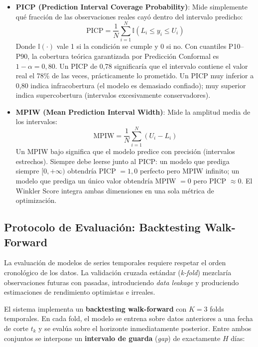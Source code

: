 \begin{itemize}
    \item \textbf{PICP (Prediction Interval Coverage Probability)}: Mide simplemente
    qué fracción de las observaciones reales cayó dentro del intervalo predicho:
    \begin{equation}
        \text{PICP} = \frac{1}{N} \sum_{i=1}^N \mathbb{I} \left( L_i \le y_i \le U_i \right)
    \end{equation}
    Donde $\mathbb{I}(\cdot)$ vale 1 si la condición se cumple y 0 si no.
    Con cuantiles P10--P90, la cobertura teórica garantizada por Predicción Conformal es
    $1 - \alpha = 0{,}80$. Un PICP de 0,78 significaría que el intervalo contiene el valor
    real el 78\% de las veces, prácticamente lo prometido. Un PICP muy inferior a 0,80
    indica infracobertura (el modelo es demasiado confiado); muy superior indica
    supercobertura (intervalos excesivamente conservadores).

    \item \textbf{MPIW (Mean Prediction Interval Width)}: Mide la amplitud media de los
    intervalos:
    \begin{equation}
        \text{MPIW} = \frac{1}{N} \sum_{i=1}^N (U_i - L_i)
    \end{equation}
    Un MPIW bajo significa que el modelo predice con precisión (intervalos estrechos).
    Siempre debe leerse junto al PICP: un modelo que prediga siempre $[0, +\infty)$
    obtendría PICP $= 1{,}0$ perfecto pero MPIW infinito; un modelo que prediga
    un único valor obtendría MPIW $= 0$ pero PICP $\approx 0$. El Winkler Score
    integra ambas dimensiones en una sola métrica de optimización.
\end{itemize}

\subsection{Protocolo de Evaluación: Backtesting Walk-Forward}
\label{sec:backtesting}

La evaluación de modelos de series temporales requiere respetar el orden cronológico de los datos. La validación cruzada estándar (\textit{k-fold}) mezclaría observaciones futuras con pasadas, introduciendo \textit{data leakage} y produciendo estimaciones de rendimiento optimistas e irreales.

El sistema implementa un \textbf{backtesting walk-forward} con $K=3$ folds temporales. En cada fold, el modelo se entrena sobre datos anteriores a una fecha de corte $t_k$ y se evalúa sobre el horizonte inmediatamente posterior. Entre ambos conjuntos se interpone un \textbf{intervalo de guarda} (\textit{gap}) de exactamente $H$ días:

